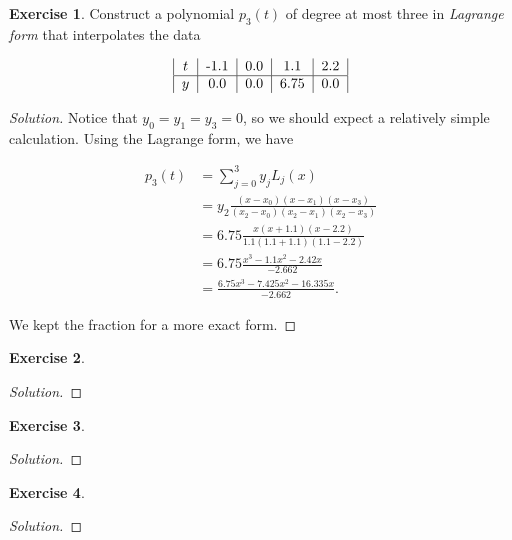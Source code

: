 \documentclass[12pt,a4]{article}
\theoremstyle{definition}
\newtheorem{exercise}{Exercise}
\begin{document}
\begin{exercise}
	Construct a polynomial $p_3(t)$ of degree at most three in \emph{Lagrange form} that interpolates the data 
	
	\[
	\begin{tabular}{|c|c|c|c|c|}
	$t$ & -1.1 & 0.0 & 1.1 & 2.2 \\
	\hline
	$y$ & 0.0 & 0.0 & 6.75 & 0.0 \\
	\end{tabular}
	\]
\end{exercise}
\begin{proof}[Solution]
	Notice that $y_0 = y_1 = y_3 = 0$, so we should expect a relatively simple calculation. Using the Lagrange form, we have
	
	\begin{align*}
	p_3(t) &= \sum_{j = 0}^3 y_j L_j(x) \\
	 &= y_2 \frac{(x - x_0) (x - x_1) (x - x_3)}{(x_2 - x_0) (x_2 - x_1) (x_2 - x_3)} \\
	 &= 6.75 \frac{x (x + 1.1) (x - 2.2)}{1.1 (1.1 + 1.1) (1.1 - 2.2)} \\
	 &= 6.75 \frac{x^3 - 1.1 x^2 - 2.42 x}{-2.662} \\
	 &= \frac{6.75 x^3 - 7.425 x^2 - 16.335 x}{-2.662} {.}
	\end{align*}
	
	We kept the fraction for a more exact form. 
\end{proof}

\begin{exercise}
	
\end{exercise}
\begin{proof}[Solution]
	
\end{proof}

\begin{exercise}
	
\end{exercise}
\begin{proof}[Solution]
	
\end{proof}

\begin{exercise}
	
\end{exercise}
\begin{proof}[Solution]
	
\end{proof}
\end{document}
